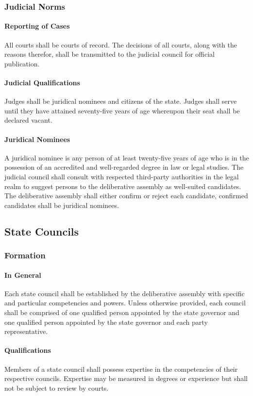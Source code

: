 \documentclass{article}
\begin{document}
\subsubsection{Judicial Norms}
\paragraph{Reporting of Cases}
All courts shall be courts of record. The decisions of all courts, along with the reasons therefor, shall be transmitted to the judicial council for official publication.
\paragraph{Judicial Qualifications}
Judges shall be juridical nominees and citizens of the state. Judges shall serve until they have attained seventy-five years of age whereupon their seat shall be declared vacant.
\paragraph{Juridical Nominees}
A juridical nominee is any person of at least twenty-five years of age who is in the possession of an accredited and well-regarded degree in law or legal studies. The judicial council shall consult with respected third-party authorities in the legal realm to suggest persons to the deliberative assembly as well-suited candidates. The deliberative assembly shall either confirm or reject each candidate, confirmed candidates shall be juridical nominees.
\subsection{State Councils}
\subsubsection{Formation}
\paragraph{In General}
Each state council shall be established by the deliberative assembly with specific and particular competencies and powers. Unless otherwise provided, each council shall be comprised of one qualified person appointed by the state governor and one qualified person appointed by the state governor and each party representative. 
\paragraph{Qualifications}
Members of a state council shall possess expertise in the competencies of their respective councils. Expertise may be measured in degrees or experience but shall not be subject to review by courts.
\end{document}
